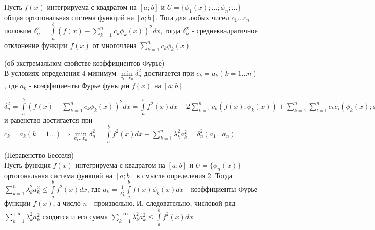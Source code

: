 \begin{Def}
	Пусть $f(x)$ интегрируема с квадратом на $[a;b]$ и $U = \{\phi_1(x); \dots ; \phi_n; \dots\}$ - общая ортогональная система функций на $[a;b]$.  Тога для любых чисел $c_1 \dots c_n$ положим $\delta_n^2 = \int\limits_{a}^{b}(f(x) - \sum\limits_{k=1}^{n}c_k\phi_k(x))^2dx$, тогда $\delta_n^2$ - среднеквадратичное отклонение функции $f(x)$ от многочлена $\sum\limits_{k=1}^{n}c_k\phi_k(x)$
\end{Def}

\begin{Th}(об экстремальном свойстве коэффициентов Фурье)\\
	В условиях определения 4 минимум $\underset{c_1 \dots c_n}{\min}\delta_n^2$ достигается при $c_k=a_k(k = 1\dots n)$, где $a_k$ - коэффициенты Фурье функции $f(x)$ на $[a;b]$
\end{Th}

\begin{Proof}
	$\delta_n^2 = \int\limits_{a}^{b}(f(x) - \sum\limits_{k=1}^{n}c_k\phi_k(x))^2dx = \int\limits_{a}^{b}f^2(x)dx - 2\sum\limits_{k=1}^{n}c_k(f(x);\phi_k(x)) + \sum\limits_{k=1}^{n}\sum\limits_{l=1}^{n}c_k c_l(\phi_k(x);\phi_l(x)) = \int\limits_{a}^{b}f^2(x)dx - 2\sum\limits_{k=1}^{n}\lambda_k^2 a_k c_k + \sum\limits_{k=1}^{n}c_k^2 \lambda_k^2 = [\lambda_k^2 c_k^2 - 2(\lambda_k^2 c_k)a_k + \lambda_k^2 a_k^2 - \lambda_k^2 a_k^2 = \lambda_k^2(c_k - a_k)^2 - \lambda_k^2 a_k^2] = \int\limits_{a}^{b}f^2(x)dx + \sum\limits_{k=1}^{n}\lambda_k^2(c_k - a_k)^2 - \sum\limits_{k=1}^{n}\lambda_k^2 a_k^2 \geq \int\limits_{a}^{b}f^2(x) - \sum\limits_{k=1}^{n}\lambda_k^2 a_k^2 = \underset{c_1 \dots c_n}{\min}\delta_n^2$ и равенство достигается при $c_k = a_k (k = 1 \dots) \Rightarrow \underset{c_1 \dots c_n}{\min}\delta_n^2 = \int\limits_{a}^{b}f^2(x)dx - \sum\limits_{k=1}^{n}\lambda_k^2 a_k^2 = \delta_n^2 (a_1 \dots a_n)$
\end{Proof}

\begin{Seq}(Неравенство Бесселя)\\
	Пусть функция $f(x)$ интегрируема с квадратом на $[a;b]$ и $U = \{\phi_n(x)\}$ ортогональная система функций на $[a;b]$ в смысле определения 2. Тогда $\sum\limits_{k=1}^{n}\lambda_k^2 a_k^2 \leq \int\limits_{a}^{b}f^2(x)dx$, где $a_k = \frac{1}{\lambda_k^2}\int\limits_{a}^{b}f(x)\phi_k(x)dx$ - коэффициенты Фурье функции $f(x)$, а число $n$ - произвольно. И, следовательно, числовой ряд $\sum\limits_{k=1}^{+\infty}\lambda_k^2 a_k^2$ сходится и его сумма $\sum\limits_{k=1}^{+\infty}\lambda_k^2 a_k^2 \leq \int\limits_{a}^{b}f^2(x)dx$
\end{Seq}

